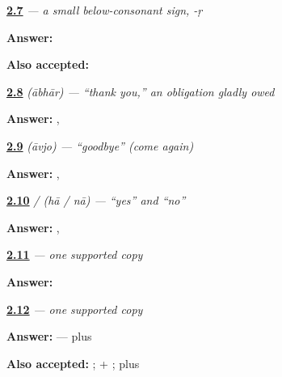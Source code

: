\noindent\begin{minipage}[t]{\linewidth}
\raggedright
\hyperlink{review-GU-W02-vocalic-r-recall}{\textbf{2.7}} \emph{ — a small below-consonant sign, -ṛ}\par
\small \textbf{Answer:} \par
\footnotesize \textbf{Also accepted:} 
\end{minipage}\par\medskip

\noindent\begin{minipage}[t]{\linewidth}
\raggedright
\hyperlink{review-GU-C01-aabhaar-script-retrieval}{\textbf{2.8}} \emph{ (ābhār) — \textquotedblleft{}thank you,\textquotedblright{} an obligation gladly owed}\par
\small \textbf{Answer:} , \par
\end{minipage}\par\medskip

\noindent\begin{minipage}[t]{\linewidth}
\raggedright
\hyperlink{review-GU-C01-aavjo-script-retrieval}{\textbf{2.9}} \emph{ (āvjo) — \textquotedblleft{}goodbye\textquotedblright{} (come again)}\par
\small \textbf{Answer:} , \par
\end{minipage}\par\medskip

\noindent\begin{minipage}[t]{\linewidth}
\raggedright
\hyperlink{review-GU-C01-haa-naa-script-retrieval}{\textbf{2.10}} \emph{ /  (hā / nā) — \textquotedblleft{}yes\textquotedblright{} and \textquotedblleft{}no\textquotedblright{}}\par
\small \textbf{Answer:} , \par
\end{minipage}\par\medskip

\noindent\begin{minipage}[t]{\linewidth}
\raggedright
\hyperlink{review-GU-W01-haa-guided-copy-dha-retrieval}{\textbf{2.11}} \emph{ — one supported copy}\par
\small \textbf{Answer:} \par
\end{minipage}\par\medskip

\noindent\begin{minipage}[t]{\linewidth}
\raggedright
\hyperlink{review-GU-W01-haa-guided-copy-check}{\textbf{2.12}} \emph{ — one supported copy}\par
\small \textbf{Answer:}  —  plus \par
\footnotesize \textbf{Also accepted:} ;  + ;  plus 
\end{minipage}\par\medskip

